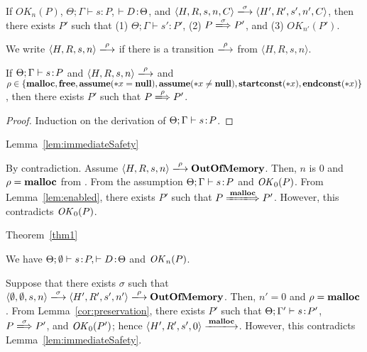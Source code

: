 \begin{corollary}
\label{cor:preservation}
If $OK_{n}(P)$, $\Theta; \Gamma \vdash s : P$, \(\vdash D \!:\!
\Theta\), and $\langle H,R,s,n,C\rangle \xlongrightarrow{\sigma}
\langle H',R',s', n', C \rangle$, then there exists $P'$ such that (1) $
\Theta; \Gamma \vdash s' : P'$, (2) \(P \xLongrightarrow{\sigma} P'\),
and (3) \(OK_{n'}(P')\).
\end{corollary}

We write \(\langle H, R, s, n \rangle \xlongrightarrow{\rho}\) if
there is a transition \(\xlongrightarrow{\rho}\) from \(\langle H, R,
s, n \rangle\).

\begin{lemma}
\label{lem:enabled}
If \(\Theta; \Gamma \vdash s \!:\! P\) and \(\langle H, R, s, n \rangle
\xlongrightarrow{\rho}\) and \(\rho \in \{\mathbf{malloc}, \mathbf{free}, \mathbf{assume}(*x = \mathbf{null}), \mathbf{assume}(*x \ne \mathbf{null}), \mathbf{startconst}(*x), \mathbf{endconst}(*x)\}\), then
there exists \(P'\) such that \(P \xLongrightarrow{\rho} P'\).
\end{lemma}

\begin{proof}
Induction on the derivation of \(\Theta; \Gamma \vdash s \!:\! P\).
\end{proof}

\begin{pfof}{Lemma~\ref{lem:immediateSafety}}

By contradiction.  Assume \(\langle H, R, s, n \rangle
\xlongrightarrow{\rho} \OVERFLOW\). Then, \(n\) is \(0\) and \(\rho =
\mathbf{malloc}\) from .  From the assumption \(\Theta;\Gamma
\vdash s \!:\! P\) and \(\mathit{OK}_0(P)\).  From Lemma~\ref{lem:enabled},
there exists \(P'\) such that \(P \xLongrightarrow{\Malloc} P'\).
However, this contradicts \(\mathit{OK}_0(P)\).


\end{pfof}


\begin{pfof}{Theorem~\ref{thm1}}

We have \(\Theta;\emptyset \vdash s\!:\! P, \vdash D\!:\! \Theta\) and
\(\mathit{OK}_n(P)\).

Suppose that there exists \(\sigma\) such that \(\langle \emptyset,
\emptyset, s, n\rangle \xlongrightarrow{\sigma} \langle H', R', s',
n'\rangle \xlongrightarrow{\rho} \OVERFLOW\).  Then, \(n' = 0\) and
\(\rho = \mathbf{malloc}\).  From Lemma~\ref{cor:preservation}, there exists
\(P'\) such that \(\Theta; \Gamma' \vdash s \!:\! P'\), \(P
\xLongrightarrow{\sigma} P'\), and \(\mathit{OK}_0(P')\); hence \(\langle H',
R', s', 0\rangle \xlongrightarrow{\Malloc}\).  However, this
contradicts Lemma~\ref{lem:immediateSafety}.

\end{pfof}
